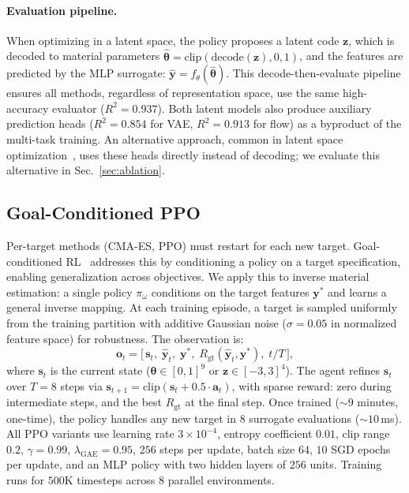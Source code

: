 \paragraph{Evaluation pipeline.} When optimizing in a latent space, the policy proposes a latent code $\mathbf{z}$, which is decoded to material parameters $\hat{\boldsymbol{\theta}} = \text{clip}(\text{decode}(\mathbf{z}), 0, 1)$, and the features are predicted by the MLP surrogate: $\hat{\mathbf{y}} = f_\theta(\hat{\boldsymbol{\theta}})$. This decode-then-evaluate pipeline ensures all methods, regardless of representation space, use the same high-accuracy evaluator ($R^2{=}0.937$). Both latent models also produce auxiliary prediction heads ($R^2{=}0.854$ for VAE, $R^2{=}0.913$ for flow) as a byproduct of the multi-task training. An alternative approach, common in latent space optimization~\cite{gomez2018automatic, maus2022lolbo, lee2025nfbo}, uses these heads directly instead of decoding; we evaluate this alternative in Sec.~\ref{sec:ablation}.

\subsection{Goal-Conditioned PPO}
\label{sec:gc}

Per-target methods (CMA-ES, PPO) must restart for each new target. Goal-conditioned RL~\cite{schaul2015universal} addresses this by conditioning a policy on a target specification, enabling generalization across objectives. We apply this to inverse material estimation: a single policy $\pi_\omega$ conditions on the target features $\mathbf{y}^*$ and learns a general inverse mapping. At each training episode, a target is sampled uniformly from the training partition with additive Gaussian noise ($\sigma{=}0.05$ in normalized feature space) for robustness. The observation is:
\begin{equation}
    \mathbf{o}_t = \bigl[\,\mathbf{s}_t,\; \hat{\mathbf{y}}_t,\; \mathbf{y}^*,\; R_{\text{gt}}(\hat{\mathbf{y}}_t, \mathbf{y}^*),\; t/T\,\bigr],
\end{equation}
where $\mathbf{s}_t$ is the current state ($\boldsymbol{\theta} \in [0,1]^9$ or $\mathbf{z} \in [-3,3]^4$). The agent refines $\mathbf{s}_t$ over $T{=}8$ steps via $\mathbf{s}_{t+1} = \text{clip}(\mathbf{s}_t + 0.5 \cdot \mathbf{a}_t)$, with sparse reward: zero during intermediate steps, and the best $R_{\text{gt}}$ at the final step. Once trained (${\sim}9$ minutes, one-time), the policy handles any new target in $8$ surrogate evaluations (${\sim}10$\,ms). All PPO variants use learning rate $3{\times}10^{-4}$, entropy coefficient $0.01$, clip range $0.2$, $\gamma{=}0.99$, $\lambda_{\text{GAE}}{=}0.95$, $256$ steps per update, batch size $64$, $10$ SGD epochs per update, and an MLP policy with two hidden layers of $256$ units. Training runs for $500$K timesteps across $8$ parallel environments.

